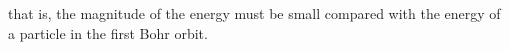 that is, the magnitude of the energy must be small compared with the energy of
a particle in the first Bohr orbit.
